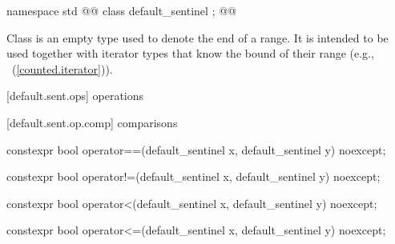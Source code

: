 \begin{addedblock}
%
\begin{itemdecl}
namespace std { @@
  class default_sentinel { };
}@\newtxt{\}\}}@
\end{itemdecl}

\pnum
Class  is an empty type used to denote the end of a
range. It is intended to be used together with iterator types that know the bound
of their range (e.g., ~(\ref{counted.iterator})).

[default.sent.ops]{ operations}

[default.sent.op.comp]{ comparisons}

%
%
\begin{itemdecl}
constexpr bool operator==(default_sentinel x, default_sentinel y) noexcept;
\end{itemdecl}

\begin{itemdescr}
\pnum
\returns {}
\end{itemdescr}

%
%
\begin{itemdecl}
constexpr bool operator!=(default_sentinel x, default_sentinel y) noexcept;
\end{itemdecl}

\begin{itemdescr}
\pnum
\returns {}
\end{itemdescr}

%
%
\begin{itemdecl}
constexpr bool operator<(default_sentinel x, default_sentinel y) noexcept;
\end{itemdecl}

\begin{itemdescr}
\pnum
\returns {}
\end{itemdescr}

%
%
\begin{itemdecl}
constexpr bool operator<=(default_sentinel x, default_sentinel y) noexcept;
\end{itemdecl}


\end{addedblock}
